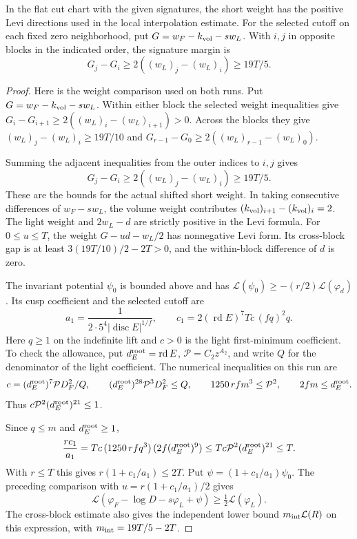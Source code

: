 \begin{lemma}
\label{lem:short-weight-curvature}
In the flat cut chart with the given signatures, the short weight
has the positive Levi directions used in the local interpolation
estimate. For the selected cutoff on each fixed zero neighborhood, put \(G=w_F-k_{\rm vol}-s w_L\). With \(i,j\) in opposite blocks in the indicated order, the signature margin is
\[
 G_j-G_i\ge2((w_L)_j-(w_L)_i)\ge19T/5.
\]

\end{lemma}

\begin{proof}
Here is the weight comparison used on both runs.
Put \(G=w_F-k_{\rm vol}-s w_L\). Within either block the
selected weight inequalities give
\(G_i-G_{i+1}\ge2((w_L)_i-(w_L)_{i+1})>0\).
Across the blocks they give
\((w_L)_j-(w_L)_i\ge19T/10\) and
\(G_{r-1}-G_0\ge2((w_L)_{r-1}-(w_L)_0)\).

Summing the adjacent inequalities from the outer
indices to \(i,j\) gives
\[
 G_j-G_i\ge2((w_L)_j-(w_L)_i)\ge19T/5 .
\]
These are the bounds for the actual shifted short weight.
In taking consecutive differences of \(w_F-s w_L\),
the volume weight contributes
\((k_{\rm vol})_{i+1}-(k_{\rm vol})_i=2\). The light weight and
\(2w_L-d\) are strictly positive in the Levi formula.
For \(0\le u\le T\), the weight \(G-u d-w_L/2\)
has nonnegative Levi form. Its cross-block gap is at
least \(3(19T/10)/2-2T>0\), and the within-block
difference of \(d\) is zero.

The invariant potential \(\psi_0\) is bounded above and
has \(\mathcal L(\psi_0)\ge-(r/2)\mathcal L(\varphi_d)\).
Its cusp coefficient and the selected cutoff are
\[
 a_1=\frac{1}{2\cdot5^4|\operatorname{disc}E|^{1/f}},
 \qquad
 c_1=2(\operatorname{rd}E)^7 T c\,(fq)^2 q .
\]
Here \(q\ge1\) on the indefinite lift and \(c>0\)
is the light first-minimum coefficient. To check the allowance, put \(d_E^{\rm root}=\operatorname{rd}E\), \(\mathcal P=C_2z^{A_2}\), and write \(Q\) for the denominator of the light coefficient.
The numerical inequalities on this run are
\[
 c=(d_E^{\rm root})^7\mathcal P D_F^2/Q,\qquad
 (d_E^{\rm root})^{28}\mathcal P^3D_F^2\le Q,\qquad
 1250\,rfm^3\le\mathcal P^2,\qquad
 2fm\le d_E^{\rm root}.
\]
Thus \(c\mathcal P^2(d_E^{\rm root})^{21}\le1\).

Since \(q\le m\) and \(d_E^{\rm root}\ge1\),
\[
 \frac{r c_1}{a_1}
    =Tc\, (1250\,rfq^3)\,(2f(d_E^{\rm root})^9)
    \le Tc\mathcal P^2(d_E^{\rm root})^{21}\le T .
\]
With \(r\le T\) this gives \(r(1+c_1/a_1)\le2T\).
Put \(\psi=(1+c_1/a_1)\psi_0\). The preceding
comparison with \(u=r(1+c_1/a_1)/2\) gives
\[
 \mathcal L(\varphi_F-\log D-s\varphi_L+\psi)
                    \ge \tfrac12\mathcal L(\varphi_L).
\]
The cross-block estimate also gives the independent
lower bound \(m_{\rm int}\mathcal L(R)\) on this expression,
with \(m_{\rm int}=19T/5-2T\).


\end{proof}
